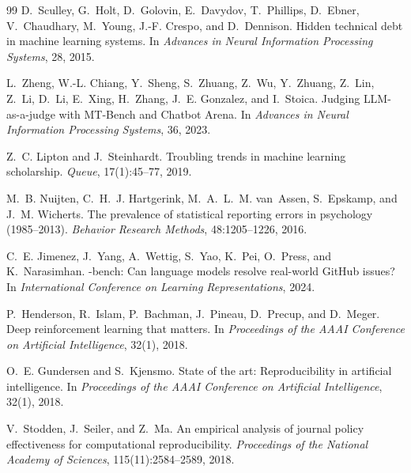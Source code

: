 \documentclass[10pt,twocolumn]{article}
\begin{document}
{\begin{thebibliography}{99}
D.~Sculley, G.~Holt, D.~Golovin, E.~Davydov, T.~Phillips, D.~Ebner,
  V.~Chaudhary, M.~Young, J.-F. Crespo, and D.~Dennison.
\newblock Hidden technical debt in machine learning systems.
\newblock In \emph{Advances in Neural Information Processing Systems}, 28, 2015.

L.~Zheng, W.-L. Chiang, Y.~Sheng, S.~Zhuang, Z.~Wu, Y.~Zhuang, Z.~Lin,
  Z.~Li, D.~Li, E.~Xing, H.~Zhang, J.~E. Gonzalez, and I.~Stoica.
\newblock Judging {LLM}-as-a-judge with {MT}-Bench and Chatbot Arena.
\newblock In \emph{Advances in Neural Information Processing Systems}, 36, 2023.

Z.~C. Lipton and J.~Steinhardt.
\newblock Troubling trends in machine learning scholarship.
\newblock \emph{Queue}, 17(1):45--77, 2019.

M.~B. Nuijten, C.~H.~J. Hartgerink, M.~A.~L.~M. van~Assen, S.~Epskamp, and
  J.~M. Wicherts.
\newblock The prevalence of statistical reporting errors in psychology
  (1985--2013).
\newblock \emph{Behavior Research Methods}, 48:1205--1226, 2016.

C.~E. Jimenez, J.~Yang, A.~Wettig, S.~Yao, K.~Pei, O.~Press, and K.~Narasimhan.
-bench: Can language models resolve real-world {GitHub} issues?
\newblock In \emph{International Conference on Learning Representations}, 2024.

P.~Henderson, R.~Islam, P.~Bachman, J.~Pineau, D.~Precup, and D.~Meger.
\newblock Deep reinforcement learning that matters.
\newblock In \emph{Proceedings of the AAAI Conference on Artificial
  Intelligence}, 32(1), 2018.

O.~E. Gundersen and S.~Kjensmo.
\newblock State of the art: Reproducibility in artificial intelligence.
\newblock In \emph{Proceedings of the AAAI Conference on Artificial
  Intelligence}, 32(1), 2018.

V.~Stodden, J.~Seiler, and Z.~Ma.
\newblock An empirical analysis of journal policy effectiveness for
  computational reproducibility.
\newblock \emph{Proceedings of the National Academy of Sciences},
  115(11):2584--2589, 2018.
\end{thebibliography}
}
\end{document}
